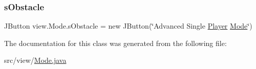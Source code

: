 \subsubsection{\texorpdfstring{s\+Obstacle}{sObstacle}}
{\footnotesize\ttfamily J\+Button view.\+Mode.\+s\+Obstacle = new J\+Button(\char`\"{}Advanced Single \hyperlink{classmodel_1_1_player}{Player} \hyperlink{classview_1_1_mode}{Mode}\char`\"{})\hspace{0.3cm}{\ttfamily [private]}}



The documentation for this class was generated from the following file\+:\begin{DoxyCompactItemize}
\item 
src/view/\hyperlink{_mode_8java}{Mode.\+java}\end{DoxyCompactItemize}
